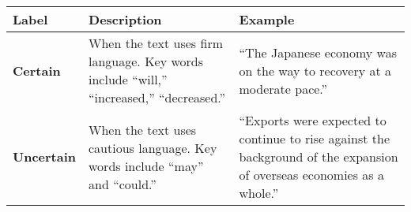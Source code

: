 \begin{table*}
    \caption{}
    \vspace{1em}
    \begin{tabular}{p{}p{}p{}}
    \toprule
    \textbf{Label} & \textbf{Description} & \textbf{Example}\\
    \midrule
    \textbf{Certain} & When the text uses firm language. Key words include ``will,'' ``increased,'' ``decreased.''
     & ``The Japanese economy was on the way to recovery at a moderate pace.'' \\
    \midrule
    \textbf{Uncertain} & When the text uses cautious language. Key words include ``may'' and ``could.''  & ``Exports were expected to continue to rise against the background of the expansion of overseas economies as a whole.''\\
    \bottomrule
    \end{tabular}
    \label{tb:boj_certainty_guide}
    \end{table*}
    